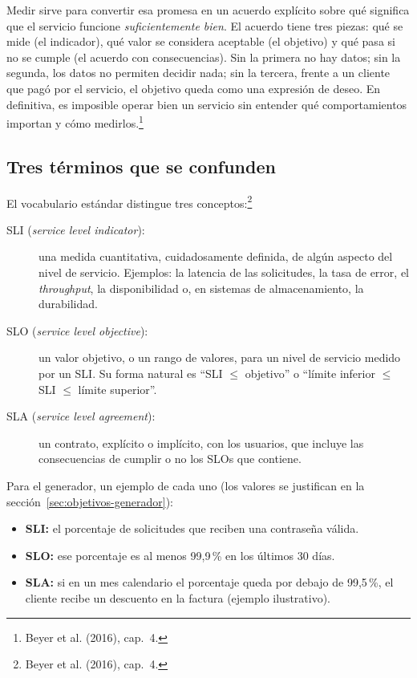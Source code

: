 \documentclass[variant=apuntes,cover=institutional,mode=screen]{ua-engineering-v6-article}
\begin{document}
Medir sirve para convertir esa promesa en un acuerdo explícito sobre qué significa que el servicio funcione \emph{suficientemente bien}. El acuerdo tiene tres piezas: qué se mide (el indicador), qué valor se considera aceptable (el objetivo) y qué pasa si no se cumple (el acuerdo con consecuencias). Sin la primera no hay datos; sin la segunda, los datos no permiten decidir nada; sin la tercera, frente a un cliente que pagó por el servicio, el objetivo queda como una expresión de deseo. En definitiva, es imposible operar bien un servicio sin entender qué comportamientos importan y cómo medirlos.\footnote{Beyer et al. (2016), cap.~4.}

\subsection{Tres términos que se confunden}

El vocabulario estándar distingue tres conceptos:\footnote{Beyer et al. (2016), cap.~4.}

\begin{description}
\item[SLI (\emph{service level indicator}):] una medida cuantitativa, cuidadosamente definida, de algún aspecto del nivel de servicio. Ejemplos: la latencia de las solicitudes, la tasa de error, el \emph{throughput}, la disponibilidad o, en sistemas de almacenamiento, la durabilidad.
\item[SLO (\emph{service level objective}):] un valor objetivo, o un rango de valores, para un nivel de servicio medido por un SLI. Su forma natural es ``SLI $\le$ objetivo'' o ``límite inferior $\le$ SLI $\le$ límite superior''.
\item[SLA (\emph{service level agreement}):] un contrato, explícito o implícito, con los usuarios, que incluye las consecuencias de cumplir o no los SLOs que contiene.
\end{description}

Para el generador, un ejemplo de cada uno (los valores se justifican en la sección~\ref{sec:objetivos-generador}):
\begin{itemize}
\item \textbf{SLI:} el porcentaje de solicitudes que reciben una contraseña válida.
\item \textbf{SLO:} ese porcentaje es al menos 99,9\,\% en los últimos 30 días.
\item \textbf{SLA:} si en un mes calendario el porcentaje queda por debajo de 99,5\,\%, el cliente recibe un descuento en la factura (ejemplo ilustrativo).
\end{itemize}
\end{document}
